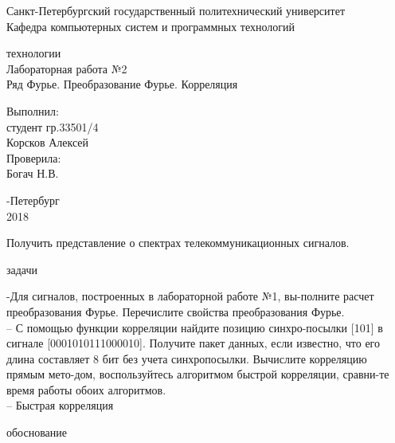 \documentclass[a4paper,12pt]{article}
\begin{document}
\begin{center}
Санкт-Петербургский государственный политехнический университет
\\Кафедра компьютерных систем и программных технологий
\end{center}
\vspace*{10em plus .6em minus .5em}

\begin{center}
{ технологии
\\Лабораторная работа №2
\\Ряд Фурье. Преобразование Фурье. Корреляция}
\end{center}

\vspace*{5em plus .6em minus .5em}
\begin{flushright}
Выполнил:\\студент гр.33501/4\\Корсков Алексей\\Проверила:\\Богач Н.В.
\end{flushright}

\vspace*{15em plus .6em minus .5em}
\begin{center}
{-Петербург
\\2018}
\end{center}
\pagestyle{empty}
\newpage
\pagestyle{plain}
{}

Получить представление о спектрах телекоммуникационных сигналов.

{ задачи}

-Для сигналов, построенных в лабораторной работе №1, вы-полните расчет преобразования Фурье. Перечислите свойства
преобразования Фурье.
\\– С помощью функции корреляции найдите позицию синхро-посылки [101] в сигнале [0001010111000010]. Получите пакет
данных, если известно, что его длина составляет 8 бит без
учета синхропосылки. Вычислите корреляцию прямым мето-дом, воспользуйтесь алгоритмом быстрой корреляции, сравни-те время работы обоих алгоритмов.
\\– Быстрая корреляция

{ обоснование}
\end{document}
